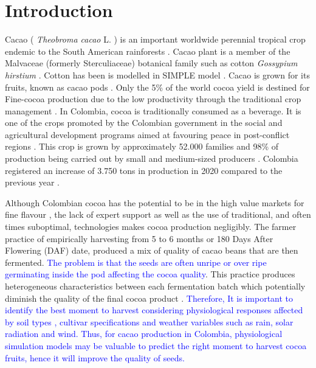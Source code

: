 \documentclass[gene,journal,article,submit,moreauthors,pdftex]{Definitions/mdpi}
\begin{document}

\section{Introduction}

Cacao ( \textit{Theobroma cacao }L. ) is an important worldwide perennial tropical crop endemic to the South American rainforests \citep{zuidema2005, motamayor2002, argout2011, Rodriguez2019}. Cacao plant is a member of the Malvaceae (formerly Sterculiaceae)  botanical family such as  cotton \textit{ Gossypium hirstium} \citep{Nix2017cotton}. Cotton has been is modelled in SIMPLE model \citep{Zao2019simple}. Cacao is grown for its fruits, known as cacao pods \citep{ Niemenak2010, suarez2021}. Only the 5\% of the world cocoa yield is destined for Fine-cocoa production due to the low productivity through  the traditional crop management \citep{argout2011}.  In Colombia, cocoa  is  traditionally  consumed  as  a  beverage. It is one of the crops promoted by the Colombian government in the social and agricultural development  programs aimed at favouring peace in post-conflict regions \citep{Rodriguez2019, Abbott2019}. This crop is grown by approximately 52.000 families \citep{Gutierrez2020} and 98\% of production being carried out by small and medium-sized producers \citep{Garcia2014, Escobar2020}. Colombia registered an increase of 3.750 tons in production in 2020 compared to the previous year \citep{lamos2020}. 

Although Colombian cocoa has the potential to be in the high value markets for fine flavour \citep{Escobar2020}, the lack of expert support as well as the use of traditional, and often times suboptimal, technologies makes cocoa production negligibly. The farmer practice of empirically harvesting from 5 to 6 months or 180 Days After Flowering  (DAF) date, produced a mix of quality of cacao beans that are then fermented. \textcolor{blue}{The problem is that  the seeds are often  unripe or  over ripe germinating inside the pod affecting the cocoa quality}. This practice produces heterogeneous characteristics between each fermentation batch which potentially diminish the quality of the final cocoa product \citep{Escobar2021}.  \textcolor{blue}{Therefore,  It is important to identify the best moment to harvest  considering physiological responses affected by  soil types , cultivar specifications and weather variables such as rain, solar radiation and wind.  Thus,  for cacao production in Colombia, physiological simulation models may be valuable to predict the right moment to harvest cocoa fruits, hence it will improve the quality of seeds.  }
	
\end{document}
